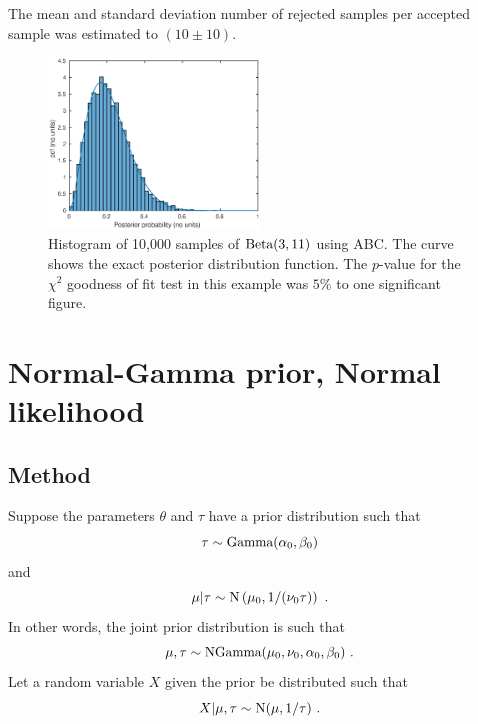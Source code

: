 \documentclass[a4paper,10pt]{article}
\begin{document}
The mean and standard deviation number of rejected samples per accepted sample was estimated to $(10\pm10)$.

\begin{figure}
\centering
\includegraphics[width=0.5\textwidth]{binomial_ABC0528.eps}
\caption{Histogram of 10,000 samples of $\textup{Beta}(3,11)$ using ABC. The curve shows the exact posterior distribution function. The $p$-value for the $\chi^2$ goodness of fit test in this example was $5\%$ to one significant figure.}
\label{binomial}
\end{figure}

\section{Normal-Gamma prior, Normal likelihood}

\subsection{Method}
Suppose the parameters $\theta$ and $\tau$ have a prior distribution such that
\begin{equation}
\tau\sim\textup{Gamma}(\alpha_0,\beta_0)
\end{equation}
and
\begin{equation}
\mu|\tau\sim\textup{N}\left(\mu_0,1/(\nu_0\tau)\right) \ .
\end{equation}
In other words, the joint prior distribution is such that
\begin{equation}
\mu,\tau\sim\textup{NGamma}(\mu_0,\nu_0,\alpha_0,\beta_0) \ .
\end{equation}
Let a random variable $X$ given the prior be distributed such that
\begin{equation}
X|\mu,\tau\sim\textup{N}(\mu,1/\tau) \ .
\end{equation}
\end{document}
